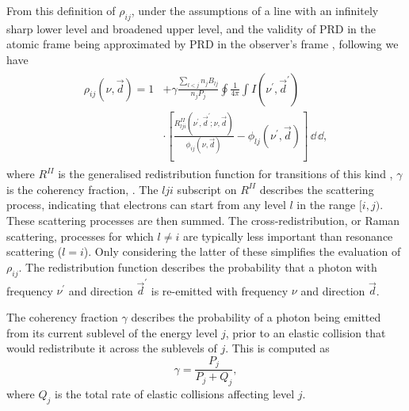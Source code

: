 From this definition of $\rho_{ij}$, under the assumptions of a line with an infinitely sharp lower level and broadened upper level, and the validity of PRD in the atomic frame being approximated by PRD in the observer's frame \citep{Uitenbroek2001}, following \citet{Hubeny2014} we have
\begin{align}
\begin{split}
    \rho_{ij}(\nu, \vec{d}) = 1 &+ \gamma\frac{\sum_{l < j}n_j B_{lj}}{n_j P_j} \oint\frac{1}{4\pi}\int I(\nu^\prime, \vec{d}^\prime) \\ &\cdot \left[ \frac{R^{II}_{lji}(\nu^\prime, \vec{d}^\prime; \nu, \vec{d})}{\phi_{ij}(\nu, \vec{d})} - \phi_{lj}(\nu^\prime, \vec{d}) \right] \mathop{\dd{}\nu^\prime}\mathop{\dd{}\Omega^\prime},
\end{split}
\end{align}
where $R^{II}$ is the generalised redistribution function for transitions of this kind \citep{Hubeny1982},  $\gamma$ is the coherency fraction, .
The $lji$ subscript on $R^{II}$ describes the scattering process, indicating that electrons can start from any level $l$ in the range $[i, j)$.
These scattering processes are then summed.
The cross-redistribution, or Raman scattering, processes for which $l\neq i$ are typically less important than resonance scattering ($l = i$).
Only considering the latter of these simplifies the evaluation of $\rho_{ij}$.
The redistribution function describes the probability that a photon with frequency $\nu^\prime$ and direction $\vec{d}^\prime$ is re-emitted with frequency $\nu$ and direction $\vec{d}$.

The coherency fraction $\gamma$ describes the probability of a photon being emitted from its current sublevel of the energy level $j$, prior to an elastic collision that would redistribute it across the sublevels of $j$.
This is computed as
\begin{equation}
    \gamma = \frac{P_j}{P_j + Q_j},
\end{equation}
where $Q_j$ is the total rate of elastic collisions affecting level $j$.

